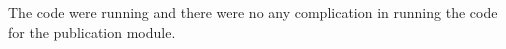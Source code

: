 The code were running and there were no any complication in running the code for the publication module.
